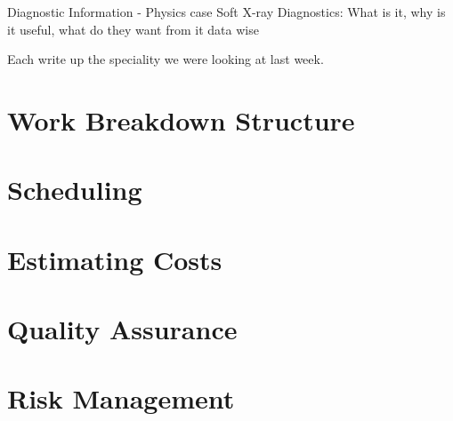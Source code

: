 \documentclass[11pt]{article}
\begin{document}
Diagnostic Information - Physics case
Soft X-ray Diagnostics: What is it, why is it useful, what do they want from it data wise

Each write up the speciality we were looking at last week.

\section{Work Breakdown Structure}
\section{Scheduling}
\section{Estimating Costs}
\section{Quality Assurance}
\section{Risk Management}
\end{document}
